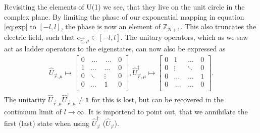 Revisiting the elements of U(1) we see, that they live on the unit circle in the complex plane. By limiting the phase of our exponential mapping in equation \cref{eq:exp} to $[-l, l]$, the phase is now an element of $\mathbb{Z}_{2l+1}$. This also truncates the electric field, such that $e_{\vec{r_i}, \mu}\in[-l, l]$. The unitary operators, which as we saw act as ladder operators to the eigenstates, can now also be expressed as
\begin{align*}
	\hat{U}_{\vec{r}, \mu} \mapsto \begin{bmatrix}
		                               0 & \,\dots\, & \,\dots \, & 0 \\
		                               1 & \dots     & \dots      & 0 \\
		                               0 & \ddots    & \vdots     & 0 \\
		                               0 & \dots     & 1          & 0 \\
	                               \end{bmatrix}, \hat{U}_{\vec{r}, \mu}^{\dag} \mapsto \begin{bmatrix}
		                                                                                    0 & 1          & \dots    & 0 \\
		                                                                                    0 & \vdots     & \ddots   & 0 \\
		                                                                                    0 & \dots      & \dots    & 1 \\
		                                                                                    0 & \,\dots \, & \dots \, & 0 \\
	                                                                                    \end{bmatrix}.
\end{align*}
The unitarity $\hat{U}_{\vec{r}, \mu}\hat{U}_{\vec{r}, \mu}^\dag\neq\mathds{1}$ for this is lost, but can be recovered in the continuum limit of $l\rightarrow\infty$. It is importend to point out, that we annihilate the first (last) state when using $\hat{U}_{\vec{r}}^{\dag}$ ($\hat{U}_{\vec{r}}$).
